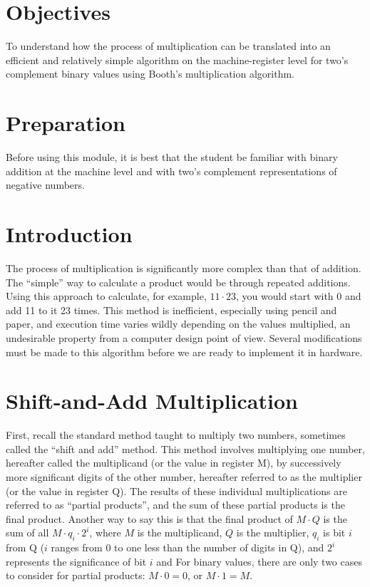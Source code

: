 \documentclass{article}
\begin{document}
\section{Objectives}
To understand how the process of multiplication can be translated into an efficient and relatively simple algorithm on the machine-register level for two's complement binary values using Booth's multiplication algorithm.

\section{Preparation}
Before using this module, it is best that the student be familiar with binary addition at the machine level and with two's complement representations of negative numbers.

\section{Introduction}
The process of multiplication is significantly more complex than that of addition.
The ``simple'' way to calculate a product would be through repeated additions.
Using this approach to calculate, for example, $11 \cdot 23$, you would start with 0 and add 11 to it 23 times.
This method is inefficient, especially using pencil and paper, and execution time varies wildly depending on the values multiplied, an undesirable property from a computer design point of view.
Several modifications must be made to this algorithm before we are ready to implement it in hardware.

\section{Shift-and-Add Multiplication}
First, recall the standard method taught to multiply two numbers, sometimes called the ``shift and add'' method.
This method involves multiplying one number, hereafter called the multiplicand (or the value in register M), by successively more significant digits of the other number, hereafter referred to as the multiplier (or the value in register Q).
The results of these individual multiplications are referred to as ``partial products'', and the sum of these partial products is the final product.
Another way to say this is that the final product of $M \cdot Q$ is the sum of all $M \cdot q_i \cdot2^i$, where $M$ is the multiplicand, $Q$ is the multiplier, $q_i$ is bit $i$ from Q ($i$ ranges from 0 to one less than the number of digits in Q), and $2^i$ represents the significance of bit $i$ and 
For binary values, there are only two cases to consider for partial products: $M \cdot 0 = 0$, or $M \cdot 1 = M$.
\end{document}
